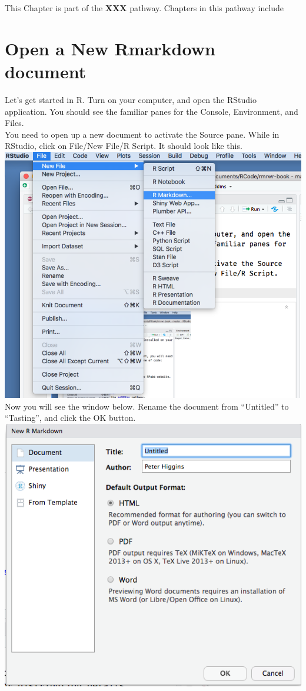 \documentclass[]{book}
\begin{document}
This Chapter is part of the \textbf{XXX} pathway.
Chapters in this pathway include

\hypertarget{open-a-new-rmarkdown-document}{%
\section{Open a New Rmarkdown document}\label{open-a-new-rmarkdown-document}}

Let's get started in R. Turn on your computer, and open the RStudio application. You should see the familiar panes for the Console, Environment, and Files.\\
You need to open up a new document to activate the Source pane. While in RStudio, click on File/New File/R Script.
It should look like this.\\
\includegraphics{images/newrmd1.png}
Now you will see the window below. Rename the document from ``Untitled'' to ``Tasting'', and click the OK button.
\includegraphics{images/newrmd2.png}
\end{document}
